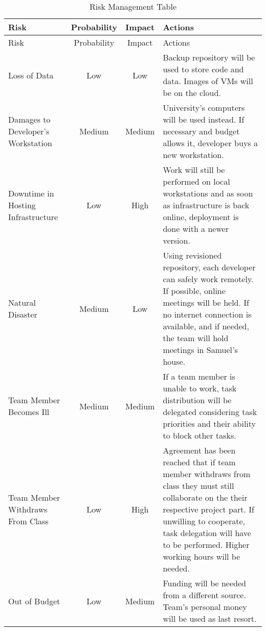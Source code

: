 \begin{center}
\setlength{\extrarowheight}{1.5pt}
    \begin{longtable}{|m{5cm}|c|c|m{5cm}|}
 \caption{Risk Management Table} \\
     \hline
    
    \centering  Risk & Probability & Impact & Actions \\
    \hline \hline \endfirsthead
    
         \hline

	\centering  Risk & Probability & Impact & Actions \\    
	\hline \hline \endhead
    
    \endfoot  
Loss of Data    & Low           & Low      & Backup repository will be used to store code and data. Images of VMs will be on the cloud.       \\ \hline
Damages to Developer's Workstation  & Medium           & Medium      & University's computers will be used instead. If necessary and budget allows it, developer buys a new workstation.       \\  \hline
    Downtime in Hosting Infrastructure & Low           & High      & Work will still be performed on local workstations and as soon as infrastructure is back online, deployment is done with a newer version.       \\  \hline
    Natural Disaster    & Medium           & Low      & Using revisioned repository, each developer can safely work remotely. If possible, online meetings will be held. If no internet connection is available, and if needed, the team will hold meetings in Samuel's house.       \\  \hline
    Team Member Becomes Ill    & Medium           & Medium      & If a team member is unable to work, task distribution will be delegated considering task priorities and their ability to block other tasks.       \\  \hline
    Team Member Withdraws From Class   & Low           & High      & Agreement has been reached that if team member withdraws from class they must still collaborate on the their respective project part. If unwilling to cooperate, task delegation will have to be performed. Higher working hours will be needed.       \\  \hline
    Out of Budget    & Low           & Medium      & Funding will be needed from a different source. Team's personal money will be used as last resort.       \\  \hline
\end{longtable}
\end{center}
